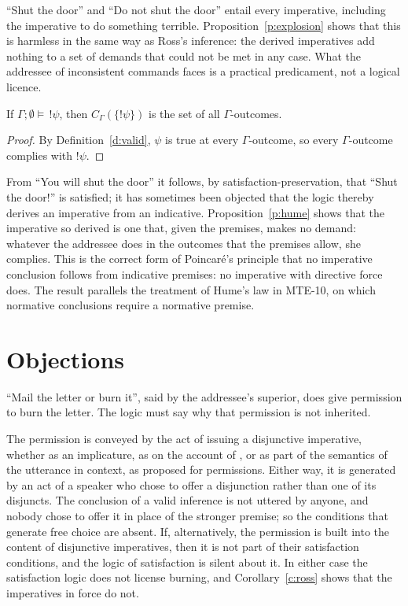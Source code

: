 \documentclass{situationist-preprint}
\begin{document}
\enquote{Shut the door} and \enquote{Do not shut the door} entail every imperative, including the imperative to do something terrible. Proposition~\ref{p:explosion} shows that this is harmless in the same way as Ross's inference: the derived imperatives add nothing to a set of demands that could not be met in any case. What the addressee of inconsistent commands faces is a practical predicament, not a logical licence.

\begin{proposition}\label{p:hume}
If $\Gamma; \emptyset \models\, !\psi$, then $C_\Gamma(\{!\psi\})$ is the set of all $\Gamma$-outcomes.
\end{proposition}

\begin{proof}
By Definition~\ref{d:valid}, $\psi$ is true at every $\Gamma$-outcome, so every $\Gamma$-outcome complies with $!\psi$.
\end{proof}

From \enquote{You will shut the door} it follows, by satisfaction-preservation, that \enquote{Shut the door!} is satisfied; it has sometimes been objected that the logic thereby derives an imperative from an indicative. Proposition~\ref{p:hume} shows that the imperative so derived is one that, given the premises, makes no demand: whatever the addressee does in the outcomes that the premises allow, she complies. This is the correct form of Poincaré's principle that no imperative conclusion follows from indicative premises: no imperative with directive force does. The result parallels the treatment of Hume's law in MTE-10, on which normative conclusions require a normative premise.

\section{Objections}

\begin{objection}
\enquote{Mail the letter or burn it}, said by the addressee's superior, does give permission to burn the letter. The logic must say why that permission is not inherited.
\end{objection}

\begin{reply}
The permission is conveyed by the act of issuing a disjunctive imperative, whether as an implicature, as on the account of \citet{Fox2007}, or as part of the semantics of the utterance in context, as \citet{Kamp1973} proposed for permissions. Either way, it is generated by an act of a speaker who chose to offer a disjunction rather than one of its disjuncts. The conclusion of a valid inference is not uttered by anyone, and nobody chose to offer it in place of the stronger premise; so the conditions that generate free choice are absent. If, alternatively, the permission is built into the content of disjunctive imperatives, then it is not part of their satisfaction conditions, and the logic of satisfaction is silent about it. In either case the satisfaction logic does not license burning, and Corollary~\ref{c:ross} shows that the imperatives in force do not.
\end{reply}
\end{document}
